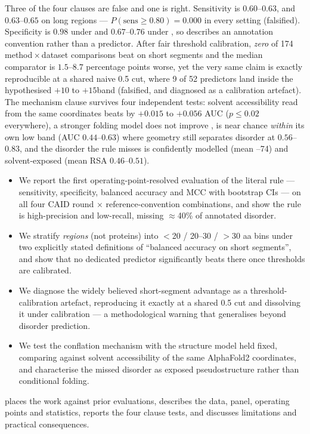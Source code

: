  Three of the four clauses are false and one is right.
Sensitivity is $0.60$--$0.63$, and $0.63$--$0.65$ on long regions --- $P(\text{sens} \ge 0.80) =
0.000$ in every setting (\cone falsified). Specificity is $0.98$ under \dpdb and $0.67$--$0.76$
under \dnox, so \ctwo describes an annotation convention rather than a predictor. After fair
threshold calibration, \emph{zero} of 174 method\,$\times$\,dataset comparisons beat \plddt on
short segments and the median comparator is $1.5$--$8.7$ percentage points worse, yet the very
same claim is exactly reproducible at a shared naive 0.5 cut, where 9 of 52 predictors land
inside the hypothesised $+10$ to $+15$\pp band (\cfour falsified, and diagnosed as a
calibration artefact). The mechanism clause survives four independent tests: solvent
accessibility read from the same coordinates beats \plddt by $+0.015$ to $+0.056$ AUC
($p \le 0.02$ everywhere), a stronger folding model does not improve \plddt, \plddt is near
chance \emph{within} its own low band (AUC $0.44$--$0.63$) where geometry still separates
disorder at $0.56$--$0.83$, and the disorder the rule misses is confidently modelled
(mean --74) and solvent-exposed (mean RSA $0.46$--$0.51$).

\begin{itemize}[leftmargin=*,itemsep=0pt,topsep=2pt]
    \item We report the first operating-point-resolved evaluation of the literal \plddtrule
    rule --- sensitivity, specificity, balanced accuracy and MCC with bootstrap CIs --- on all
    four CAID round $\times$ reference-convention combinations, and show the rule is
    high-precision and low-recall, missing $\approx$40\% of annotated disorder.
    \item We stratify \emph{regions} (not proteins) into $<$20 / 20--30 / $>$30 aa bins under
    two explicitly stated definitions of ``balanced accuracy on short segments'', and show that
    no dedicated predictor significantly beats \plddt there once thresholds are calibrated.
    \item We diagnose the widely believed short-segment advantage as a threshold-calibration
    artefact, reproducing it exactly at a shared 0.5 cut and dissolving it under calibration ---
    a methodological warning that generalises beyond disorder prediction.
    \item We test the conflation mechanism with the structure model held fixed, comparing
    \plddt against solvent accessibility of the same AlphaFold2 coordinates, and characterise
    the missed disorder as exposed pseudostructure rather than conditional folding.
\end{itemize}

 places the work against prior evaluations,  describes
the data, panel, operating points and statistics,  reports the four clause
tests, and  discusses limitations and practical consequences.
